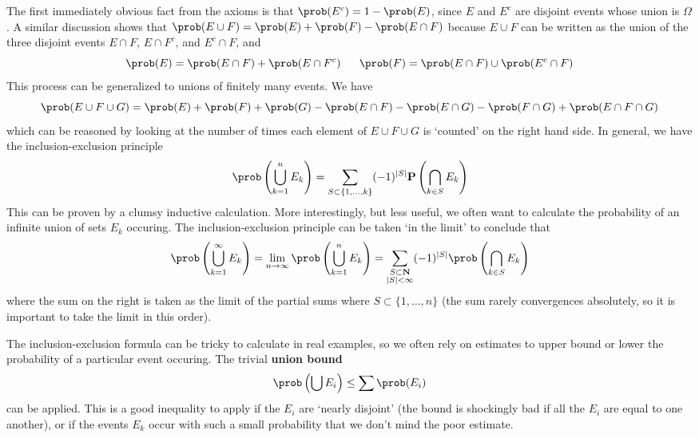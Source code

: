 The first immediately obvious fact from the axioms is that $\prob(E^c) = 1 - \prob(E)$, since $E$ and $E^c$ are disjoint events whose union is $\Omega$. A similar discussion shows that $\prob(E \cup F) = \prob(E) + \prob(F) - \prob(E \cap F)$ because $E \cup F$ can be written as the union of the three disjoint events $E \cap F$, $E \cap F^c$, and $E^c \cap F$, and
%
\[ \prob(E) = \prob(E \cap F) + \prob(E \cap F^c)\ \ \ \ \ \prob(F) = \prob(E \cap F) \cup \prob(E^c \cap F) \]
%
This process can be generalized to unions of finitely many events. We have
%
\[ \prob(E \cup F \cup G) = \prob(E) + \prob(F) + \prob(G) - \prob(E \cap F) - \prob(E \cap G) - \prob(F \cap G) + \prob(E \cap F \cap G) \]
%
which can be reasoned by looking at the number of times each element of $E \cup F \cup G$ is `counted' on the right hand side. In general, we have the inclusion-exclusion principle
%
\[ \prob \left( \bigcup_{k = 1}^n E_k \right) = \sum_{S \subset \{ 1, \dots, k \}} (-1)^{|S|} \mathbf{P} \left( \bigcap_{k \in S} E_k \right) \]
%
This can be proven by a clumsy inductive calculation. More interestingly, but less useful, we often want to calculate the probability of an infinite union of sets $E_k$ occuring. The inclusion-exclusion principle can be taken `in the limit' to conclude that
%
\[ \prob \left(\bigcup_{k = 1}^\infty E_k \right) = \lim_{n \to \infty} \prob \left( \bigcup_{k = 1}^n E_k \right) = \sum_{\substack{S \subset \mathbf{N}\\|S| < \infty}} (-1)^{|S|} \prob \left( \bigcap_{k \in S} E_k \right) \]
%
where the sum on the right is taken as the limit of the partial sums where $S \subset \{ 1, \dots, n \}$ (the sum rarely convergences absolutely, so it is important to take the limit in this order).

The inclusion-exclusion formula can be tricky to calculate in real examples, so we often rely on estimates to upper bound or lower the probability of a particular event occuring. The trivial {\bf union bound}
%
\[ \prob \left( \bigcup E_i \right) \leq \sum \prob(E_i) \]
%
can be applied. This is a good inequality to apply if the $E_i$ are `nearly disjoint' (the bound is shockingly bad if all the $E_i$ are equal to one another), or if the events $E_k$ occur with such a small probability that we don't mind the poor estimate.

